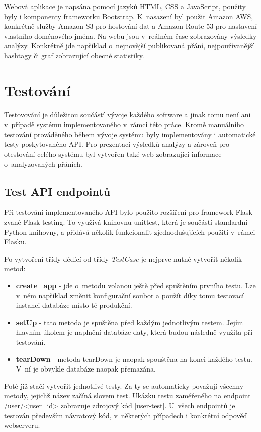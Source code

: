 \documentclass[thesis=B,czech]{FITthesis}[2012/06/26]
\begin{document}
	Webová aplikace je napsána pomocí jazyků HTML, CSS a JavaScript, použity byly i komponenty frameworku Bootstrap. K~nasazení byl použit Amazon AWS, konkrétně služby Amazon S3 pro hostování dat a Amazon Route 53 pro nastavení vlastního doménového jména. Na webu jsou v~reálném čase zobrazovány výsledky analýzy. Konkrétně jde například o~nejnovější publikovaná přání, nejpoužívanější hashtagy či graf zobrazující obecné statistiky. 


\chapter{Testování}
\label{testovani}
Testovování je důležitou součástí vývoje každého software a jinak tomu není ani v~případě systému implementovaného v~rámci této práce. Kromě manuálního testování prováděného během vývoje systému byly implementovány i automatické testy poskytovaného API. Pro prezentaci výsledků analýzy a zároveň pro otestování celého systému byl vytvořen také web zobrazující informace o~analyzovaných přáních. 


\section{Test API endpointů}
\label{api-testing}
Při testování implementovaného API bylo použito rozšíření pro framework Flask zvané Flask-testing. To využívá knihovnu unittest, která je součástí standardní Python knihovny, a přidává několik funkcionalit zjednodušujících použití v~rámci Flasku. 

Po vytvoření třídy dědící od třídy \textit{TestCase} je nejprve nutné vytvořit několik metod:

\begin{itemize}
\item \textbf{create\_app} - jde o~metodu volanou ještě před spuštěním prvního testu. Lze v~něm například změnit konfigurační soubor a použít díky tomu testovací instanci databáze místo té produkční. 
\item \textbf{setUp} - tato metoda je spuštěna před každým jednotlivým testem. Jejím hlavním úkolem je naplnění databáze daty, která budou následně využita při testování. 
\item \textbf{tearDown} - metoda tearDown je naopak spouštěna na konci každého testu. V~ní je obvykle databáze naopak přemazána. 
\end{itemize}

Poté již stačí vytvořit jednotlivé testy. Za ty se automaticky považují všechny metody, jejichž název začíná slovem test. Ukázku testu zaměřeného na endpoint /user/<user\_id> zobrazuje zdrojový kód \ref{user-test}. U~všech endpointů je testován především návratový kód, v~některých případech i konkrétní odpověď webserveru. 
\end{document}
